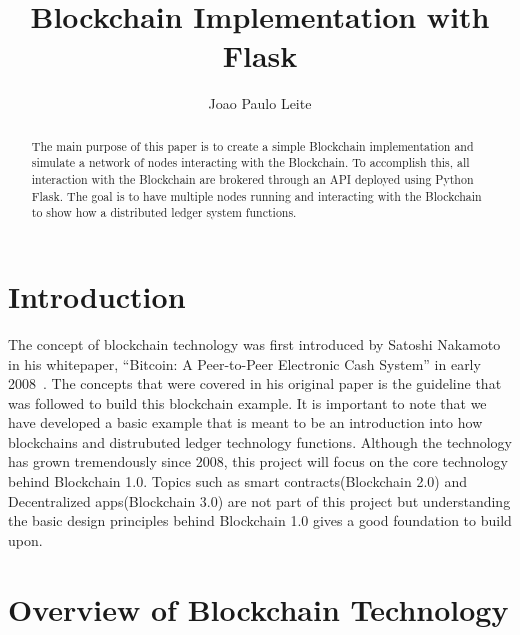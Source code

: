 
\title{Blockchain Implementation with Flask}


\author{Joao Paulo Leite}

\renewcommand{\shortauthors}{J. P. Leite}


\begin{abstract}
  The main purpose of this paper is to create a simple Blockchain
  implementation and simulate a network of nodes interacting with the
  Blockchain. To accomplish this, all interaction with the Blockchain
  are brokered through an API deployed using Python Flask. The goal is
  to have multiple nodes running and interacting with the Blockchain
  to show how a distributed ledger system functions.

\end{abstract}



\maketitle

\section{Introduction}

The concept of blockchain technology was first introduced by Satoshi
Nakamoto in his whitepaper, ``Bitcoin: A Peer-to-Peer Electronic Cash
System'' in early
2008~\cite{hid-sp18-414-www-blockchain-theory-application}.  The
concepts that were covered in his original paper is the guideline that
was followed to build this blockchain example. It is important to note
that we have developed a basic example that is meant to be an
introduction into how blockchains and distrubuted ledger technology
functions. Although the technology has grown tremendously since 2008,
this project will focus on the core technology behind Blockchain
1.0. Topics such as smart contracts(Blockchain 2.0) and Decentralized
apps(Blockchain 3.0) are not part of this project but understanding
the basic design principles behind Blockchain 1.0 gives a good
foundation to build upon.

\section{Overview of Blockchain Technology}

